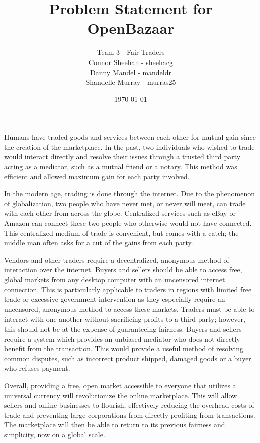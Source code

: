\documentclass[12pt]{report}
\begin{document}
\title{Problem Statement for OpenBazaar} 
\author{Team 3 - Fair Traders \\ Connor Sheehan - sheehacg \\Danny Mandel - mandeldr \\ Shandelle Murray - murras25}
\date{\today}
	
\maketitle

Humans have traded goods and services between each other for mutual gain since the creation of the marketplace. In the past, two individuals who wished to trade would interact directly and resolve their issues through a trusted third party acting as a mediator, such as a mutual friend or a notary. This method was efficient and allowed maximum gain for each party involved. 
	
In the modern age, trading is done through the internet. Due to the phenomenon of globalization, two people who have never met, or never will meet, can trade with each other from across the globe. Centralized services such as eBay or Amazon can connect these two people who otherwise would not have connected. This centralized medium of trade is convenient, but comes with a catch; the middle man often asks for a cut of the gains from each party. 

Vendors and other traders require a decentralized, anonymous method of interaction over the internet. Buyers and sellers should be able to access free, global markets from any desktop computer with an uncensored internet connection. This is particularly applicable to traders in regions with limited free trade or excessive government intervention as they especially require an uncensored, anonymous method to access these markets. Traders must be able to interact with one another without sacrificing profits to a third party; however, this should not be at the expense of guaranteeing fairness. Buyers and sellers require a system which provides an unbiased mediator who does not directly benefit from the transaction. This would provide a useful method of resolving common disputes, such as incorrect product shipped, damaged goods or a buyer who refuses payment.
	
Overall, providing a free, open market accessible to everyone that utilizes a universal currency will revolutionize the online marketplace. This will allow sellers and online businesses to flourish, effectively reducing the overhead costs of trade and preventing large corporations from directly profiting from transactions. The marketplace will then be able to return to its previous fairness and simplicity, now on a global scale.
\end{document}
